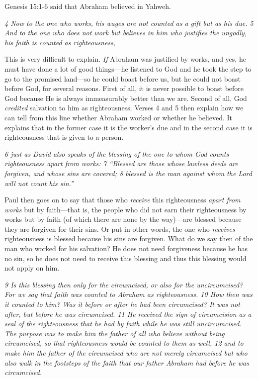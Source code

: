 Genesis 15:1-6 said that Abraham believed in Yahweh.

\emph{4 Now to the one who works, his wages are not counted as a gift
but as his due. 5 And to the one who does not work but believes in him
who justifies the ungodly, his faith is counted as righteousness,}

This is very difficult to explain. \emph{If} Abraham was justified by
works, and yes, he must have done a lot of good things---he listened to
God and he took the step to go to the promised land---so he could boast
before us, but he could not boast before God, for several reasons. First
of all, it is never possible to boast before God because He is always
immeasurably better than we are. Second of all, God \emph{credited}
salvation to him as righteousness. Verses 4 and 5 then explain how we
can tell from this line whether Abraham worked or whether he believed.
It explains that in the former case it is the worker's due and in the
second case it is righteousness that is given to a person.

\emph{6 just as David also speaks of the blessing of the one to whom God
counts righteousness apart from works:} \emph{7 ``Blessed are those
whose lawless deeds are forgiven, and whose sins are
covered; 8 blessed is the man against whom the Lord will not
count his sin.''}

Paul then goes on to say that those who \emph{receive} this
righteousness \emph{apart from works} but by faith---that is, the people
who did not earn their righteousness by works but by faith (of which
there are none by the way)---are blessed because they are forgiven for
their sins. Or put in other words, the one who \emph{receives}
righteousness is blessed because his sins are forgiven. What do we say
then of the man who worked for his salvation? He does not need
forgiveness because he has no sin, so he does not need to receive this
blessing and thus this blessing would not apply on him.

\emph{9 Is this blessing then only for the circumcised, or also for the
uncircumcised? For we say that faith was counted to Abraham as
righteousness. 10 How then was it counted to him? Was it before or after
he had been circumcised? It was not after, but before he was
circumcised. 11 He received the sign of circumcision as a seal of the
righteousness that he had by faith while he was still uncircumcised. The
purpose was to make him the father of all who believe without being
circumcised, so that righteousness would be counted to them as well, 12
and to make him the father of the circumcised who are not merely
circumcised but who also walk in the footsteps of the faith that our
father Abraham had before he was circumcised.}

